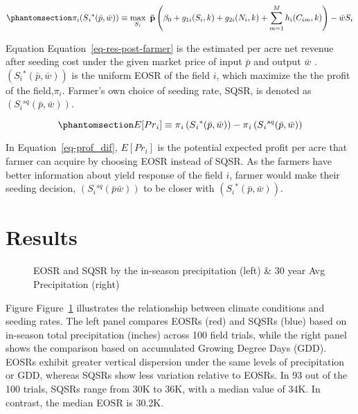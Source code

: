 \documentclass[
]{article}
\begin{document}
\begin{equation}\phantomsection\label{eq-res-post-farmer}{
\pi_i(S{_i}^*(\bar{p}, \bar{w}))  \equiv \max_{S_{i}} \ \mathbf{\bar{p}} \left(\beta_0 + g_{1i}(S_{i},k) + g_{2i}(N_{i},k) + \sum_{m=1}^{M} h_{i}(C_{im},k)\right) - \bar{w} S_i
}\end{equation}

Equation Equation~\ref{eq-res-post-farmer} is the estimated per acre net
revenue after seeding cost under the given market price of input
\(\bar{p}\) and output \(\bar{w}\) .
\(\left(S{_i}^*(\bar{p}, \bar{w})\right)\) is the uniform EOSR of the
field \(i\), which maximize the the profit of the field,\(\pi{_i}\).
Farmer's own choice of seeding rate, SQSR, is denoted as
\(\left(S{_i}^{sq}(\bar{p}, \bar{w})\right)\).

\begin{equation}\phantomsection\label{eq-prof_dif}{
   E[Pr{_i}]  \equiv  \pi{_i} \left(S{_i}^{*}(\bar{p}, \bar{w})\right) -  \pi{_i} \left(S{_i}^{sq}(\bar{p}, \bar{w})\right)
}\end{equation}

In Equation~\ref{eq-prof_dif}, \(E[Pr{_i}]\) is the potential expected
profit per acre that farmer can acquire by choosing EOSR instead of
SQSR. As the farmers have better information about yield response of the
field \(i\), farmer would make their seeding decision,
\(\left(S{_i}^{sq}(\bar{p} \bar{w})\right)\) to be closer with
\(\left(S{_i}^*(\bar{p}, \bar{w})\right)\).

\section{Results}\label{results}

\begin{figure}


\caption{\label{fig-eosr-sqsr-weather}EOSR and SQSR by the in-season
precipitation (left) \& 30 year Avg Precipitation (right)}

\end{figure}%

Figure Figure~\ref{fig-eosr-sqsr-weather} illustrates the relationship
between climate conditions and seeding rates. The left panel compares
EOSRs (red) and SQSRs (blue) based on in-season total precipitation
(inches) across 100 field trials, while the right panel shows the
comparison based on accumulated Growing Degree Days (GDD). EOSRs exhibit
greater vertical dispersion under the same levels of precipitation or
GDD, whereas SQSRs show less variation relative to EOSRs. In 93 out of
the 100 trials, SQSRs range from 30K to 36K, with a median value of 34K.
In contrast, the median EOSR is 30.2K.
\end{document}
